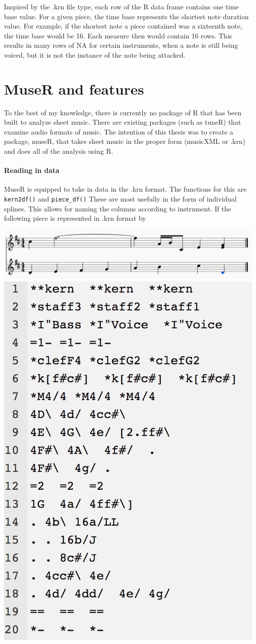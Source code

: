 \documentclass[12pt,twoside]{reedthesis}
\theoremstyle{definition}
\theoremstyle{definition}
\theoremstyle{definition}
\theoremstyle{remark}
\begin{document}
Inspired by the .krn file type, each row of the R data frame contains
one time base value. For a given piece, the time base represents the
shortest note duration value. For example, if the shortest note a piece
contained was a sixteenth note, the time base would be 16. Each measure
then would contain 16 rows. This results in many rows of NA for certain
instruments, when a note is still being voiced, but it is not the
instance of the note being attacked.

\chapter{MuseR and features}\label{muser-and-features}

To the best of my knowledge, there is currently no package of R that has
been built to analyze sheet music. There are existing packages (such as
tuneR) that examine audio formats of music. The intention of this thesis
was to create a package, museR, that takes sheet music in the proper
form (musicXML or .krn) and does all of the analysis using R.

\subsubsection{Reading in data}\label{reading-in-data}

MuseR is equipped to take in data in the .krn format. The functions for
this are \texttt{kern2df()} and \texttt{piece\_df()} These are most
usefully in the form of individual splines. This allows for naming the
columns according to instrument. If the following piece is represented
in .krn format by

\includegraphics[width=0.5\linewidth]{images/ex1m}
\includegraphics[width=0.5\linewidth]{images/ex1k}
\end{document}
